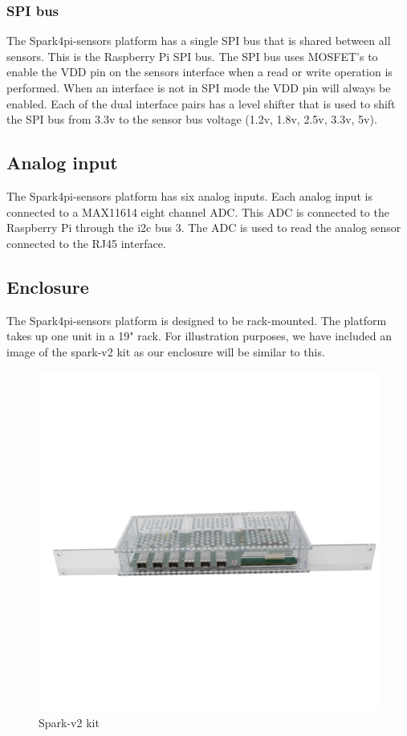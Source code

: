 \documentclass[12pt]{article}
\begin{document}
\subsubsection{SPI bus}
The Spark4pi-sensors platform has a single SPI bus that is shared between all sensors. This is the Raspberry Pi SPI bus.
The SPI bus uses MOSFET's to enable the VDD pin on the sensors interface when a read or write operation is performed.
When an interface is not in SPI mode the VDD pin will always be enabled.
Each of the dual interface pairs has a level shifter that is used to shift the SPI bus from 3.3v to the sensor bus voltage (1.2v, 1.8v, 2.5v, 3.3v, 5v).
\subsection{Analog input}
The Spark4pi-sensors platform has six analog inputs. Each analog input is connected to a MAX11614 eight channel ADC.
This ADC is connected to the Raspberry Pi through the i2c bus 3. The ADC is used to read the analog sensor connected to the RJ45 interface.
\subsection{Enclosure}
The Spark4pi-sensors platform is designed to be rack-mounted. The platform takes up one unit in a 19" rack.
For illustration purposes, we have included an image of the spark-v2 kit as our enclosure will be similar to this.
\begin{figure}[H]
    \centering
    \includegraphics[width=\textwidth]{enclosure.png}
    \caption{Spark-v2 kit}
\end{figure}
\end{document}
